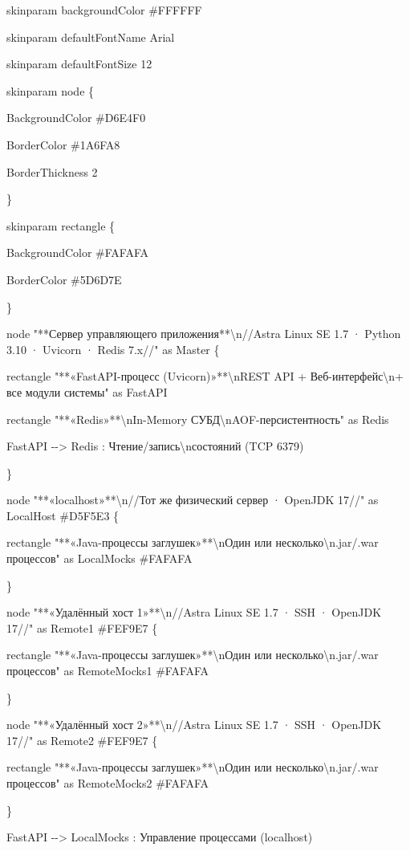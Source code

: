 \documentclass[
]{article}
\begin{document}
skinparam backgroundColor \#FFFFFF

skinparam defaultFontName Arial

skinparam defaultFontSize 12

skinparam node \{

BackgroundColor \#D6E4F0

BorderColor \#1A6FA8

BorderThickness 2

\}

skinparam rectangle \{

BackgroundColor \#FAFAFA

BorderColor \#5D6D7E

\}

node "**Сервер управляющего приложения**\textbackslash n//Astra Linux SE
1.7 · Python 3.10 · Uvicorn · Redis 7.x//" as Master \{

rectangle "**«FastAPI-процесс (Uvicorn)»**\textbackslash nREST API +
Веб-интерфейс\textbackslash n+ все модули системы" as FastAPI

rectangle "**«Redis»**\textbackslash nIn-Memory
СУБД\textbackslash nAOF-персистентность" as Redis

FastAPI -\/-\textgreater{} Redis :
Чтение/запись\textbackslash nсостояний (TCP 6379)

\}

node "**«localhost»**\textbackslash n//Тот же физический сервер ·
OpenJDK 17//" as LocalHost \#D5F5E3 \{

rectangle "**«Java-процессы заглушек»**\textbackslash nОдин или
несколько\textbackslash n.jar/.war процессов" as LocalMocks \#FAFAFA

\}

node "**«Удалённый хост 1»**\textbackslash n//Astra Linux SE 1.7 · SSH ·
OpenJDK 17//" as Remote1 \#FEF9E7 \{

rectangle "**«Java-процессы заглушек»**\textbackslash nОдин или
несколько\textbackslash n.jar/.war процессов" as RemoteMocks1 \#FAFAFA

\}

node "**«Удалённый хост 2»**\textbackslash n//Astra Linux SE 1.7 · SSH ·
OpenJDK 17//" as Remote2 \#FEF9E7 \{

rectangle "**«Java-процессы заглушек»**\textbackslash nОдин или
несколько\textbackslash n.jar/.war процессов" as RemoteMocks2 \#FAFAFA

\}

FastAPI -\/-\textgreater{} LocalMocks : Управление процессами
(localhost)
\end{document}
